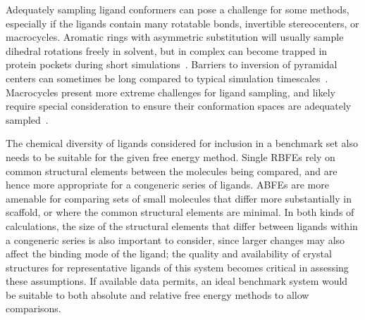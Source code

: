 \documentclass[9pt,bestpractices]{livecoms}
\begin{document}
Adequately sampling ligand conformers can pose a challenge for some methods, especially if the ligands contain many rotatable bonds, invertible stereocenters, or macrocycles.
Aromatic rings with asymmetric substitution will usually sample dihedral rotations freely in solvent, but in complex can become trapped in protein pockets during short simulations~\cite{kaus_how_2015,sasmal_sampling_2020}. 
Barriers to inversion of pyramidal centers can sometimes be long compared to typical simulation timescales~\cite{koeppl1967inversion}.
Macrocycles present more extreme challenges for ligand sampling, and likely require special consideration to ensure their conformation spaces are adequately sampled~\cite{wagner_computational_2017,yu_accurate_2017,paulsen_evaluation_2020}. 

The chemical diversity of ligands considered for inclusion in a benchmark set also needs to be suitable for the given free energy method. 
Single RBFEs rely on common structural elements between the molecules being compared, and are hence more appropriate for a congeneric series of ligands. 
%
ABFEs are more amenable for comparing sets of small molecules that differ more substantially in scaffold, or where the common structural elements are minimal. 
In both kinds of calculations, the size of the structural elements that differ between ligands within a congeneric series is also important to consider, since larger changes may also affect the binding mode of the ligand; the quality and availability of crystal structures for representative ligands of this system becomes critical in assessing these assumptions.
If available data permits, an ideal benchmark system would be suitable to both absolute and relative free energy methods to allow comparisons.
\end{document}
